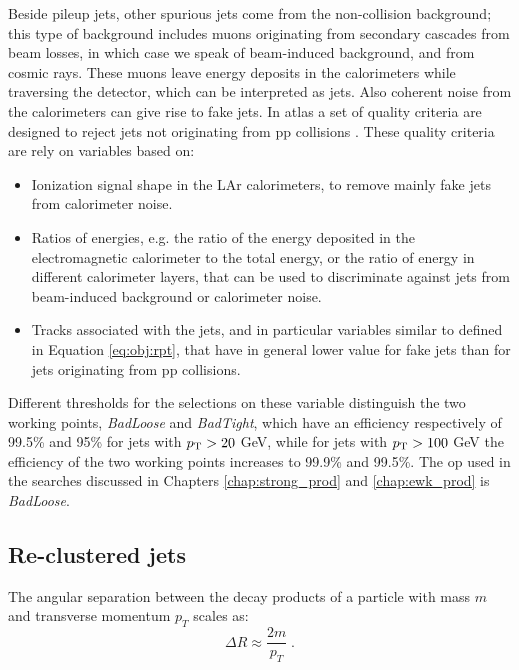 Beside pileup jets, other spurious jets come from the non-collision background; this type of background includes muons originating from secondary cascades from beam losses, in which case we speak of beam-induced background, and from cosmic rays. These muons leave energy deposits in the calorimeters while traversing the detector, which can be interpreted as jets. Also coherent noise from the calorimeters can give rise to fake jets. In \gls{atlas} a set of quality criteria are designed to reject jets not originating from \gls{pp} collisions \cite{ATLAS-CONF-2015-029}. These quality criteria are rely on variables based on:
\begin{itemize}
\item Ionization signal shape in the LAr calorimeters, to remove mainly fake jets from calorimeter noise. 
\item Ratios of energies, e.g. the ratio of the energy deposited in the electromagnetic calorimeter to the total energy, or the ratio of energy in different calorimeter layers, that can be used to discriminate against jets from beam-induced background or calorimeter noise.
\item Tracks associated with the jets, and in particular variables similar to \RpT defined in Equation \ref{eq:obj:rpt}, that have in general lower value for fake jets than for jets originating from \gls{pp} collisions. 
\end{itemize} 

Different thresholds for the selections on these variable distinguish the two working points, \textit{BadLoose} and \textit{BadTight}, which have an efficiency respectively of 99.5\% and 95\% for jets with $p_{\rm T} > 20$ GeV, while for jets with $p_{\rm T} > 100$ GeV the efficiency of the two working points increases to 99.9\% and 99.5\%. The \gls{op} used in the searches discussed in Chapters \ref{chap:strong_prod} and \ref{chap:ewk_prod} is \textit{BadLoose}. 

\subsection{Re-clustered jets}
\label{sec:reclustering}

The angular separation between the decay products of a particle with mass $m$ and transverse momentum 
$p_T$ scales as:
\begin{equation}
\Delta R \approx \frac{2 m}{p_T} \; . \nonumber
\end{equation}

